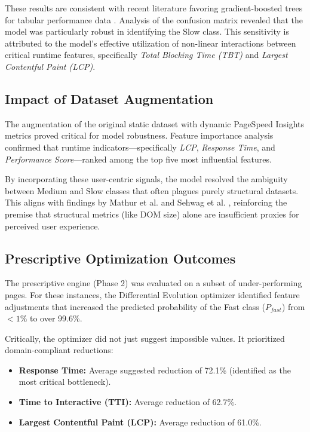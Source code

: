 \documentclass[sn-nature]{sn-jnl}
\begin{document}
These results are consistent with recent literature favoring gradient-boosted trees for tabular performance data \cite{xin2023, huang2023}. Analysis of the confusion matrix revealed that the model was particularly robust in identifying the Slow class. This sensitivity is attributed to the model's effective utilization of non-linear interactions between critical runtime features, specifically \textit{Total Blocking Time (TBT)} and \textit{Largest Contentful Paint (LCP)}.

\subsection{Impact of Dataset Augmentation}

The augmentation of the original static dataset with dynamic PageSpeed Insights metrics proved critical for model robustness. Feature importance analysis confirmed that runtime indicators—specifically \textit{LCP}, \textit{Response Time}, and \textit{Performance Score}—ranked among the top five most influential features.

By incorporating these user-centric signals, the model resolved the ambiguity between Medium and Slow classes that often plagues purely structural datasets. This aligns with findings by Mathur et al. \cite{mathur2024} and Sehwag et al. \cite{sehwag2024}, reinforcing the premise that structural metrics (like DOM size) alone are insufficient proxies for perceived user experience.

\subsection{Prescriptive Optimization Outcomes}

The prescriptive engine (Phase 2) was evaluated on a subset of under-performing pages. For these instances, the Differential Evolution optimizer identified feature adjustments that increased the predicted probability of the Fast class ($P_{fast}$) from $<1\%$ to over 99.6\%.

Critically, the optimizer did not just suggest impossible values. It prioritized domain-compliant reductions:
\begin{itemize}
    \item \textbf{Response Time:} Average suggested reduction of 72.1\% (identified as the most critical bottleneck).
    \item \textbf{Time to Interactive (TTI):} Average reduction of 62.7\%.
    \item \textbf{Largest Contentful Paint (LCP):} Average reduction of 61.0\%.
\end{itemize}
\end{document}
